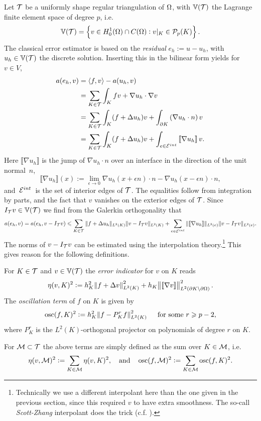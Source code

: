 \documentclass[thesis.tex]{subfiles}
\begin{document}
  Let $\mathcal{T}$ be a uniformly shape regular triangulation of $\Omega$, with $\mathbb{V}(\mathcal{T})$ the Lagrange finite element space of degree $p$, i.e. 
  \[
    \mathbb{V}(\mathcal{T}) = \set{ v \in H_0^1(\Omega) \cap C(\Omega) :  v|_K \in \mathcal{P}_p(K)}.
  \] 
  The classical error estimator is based on the \emph{residual} $e_h := u - u_h$, with $u_h\in \mathbb{V}(\mathcal{T})$ the discrete solution. Inserting this in the bilinear form yields for $v \in V$,
  \begin{align*}
    a(e_h, v) &= \left \langle f,v \right \rangle - a(u_h, v) \\
              &= \sum_{K \in \mathcal{T}} \int_K fv + \nabla u_h \cdot \nabla v \\
              &= \sum_{K \in \mathcal{T}} \int_K (f + \Delta u_h)v+\int_{\partial K} \left(\nabla u_h \cdot n\right) v\\
    &= \sum_{K \in \mathcal{T}} \int_K (f + \Delta u_h)v+\int_{e \in \mathcal{E}^{int}} \left \llbracket \nabla u_h \right \rrbracket  v.
  \end{align*}
  Here $\llbracket \nabla u_h \rrbracket$ is the jump of $\nabla u_h \cdot n$ over an interface in the direction of the unit normal~$n$,
  \[
    \llbracket \nabla u_h \rrbracket(x) := \lim_{\epsilon \to 0} \nabla u_h(x + \epsilon n) \cdot n - \nabla u_h(x - \epsilon n)\cdot n,
  \]
  and~$\mathcal{E}^{int}$~is the set of interior
  edges of $\mathcal{T}$. The equalities follow from integration by parts, and the fact that $v$ vanishes on the exterior edges of $\mathcal{T}$.
  Since $I_{\mathcal{T}} v \in \mathbb{V}(\mathcal{T})$ we find from the Galerkin orthogonality that
  \[
    a(e_h, v) = a(e_h, v - I_{\mathcal{T}} v) \leqslant \sum_{K \in \mathcal{T}} \| f + \Delta u_h\|_{L^2(K)} \| v - I_{\mathcal{T}} v\|_{L^2(K)} + \sum_{e \in \mathcal{E}^{int}} \|\llbracket \nabla u_h \rrbracket \|_{L^2(e)} \|v - I_{\mathcal{T}} v\|_{L^2(e)}.
  \]
  The norms of  $v - I_{\mathcal{T}} v$ can be estimated using the interpolation theory.\footnote{Technically we use a different interpolant here than the one given in the previous section, since this required $v$ to have extra smoothness. The so-call \emph{Scott-Zhang} interpolant does the trick (c.f. \cite[Ch~4.9]{brenner}).} This gives reason for the following definitions.
  \begin{defn}
    \label{def:clasest}
    For $K \in \mathcal{T}$ and $v \in \mathbb{V}(\mathcal{T})$ the \emph{error indicator} for $v$ on $K$ reads
    \[
      \eta(v, K)^2 := h_K^2 \norm{f + \Delta v}^2_{L^2(K)} + h_K\norm{\llbracket \nabla v \rrbracket}^2_{L^2(\partial K\setminus \partial \Omega)}.
    \]
    The \emph{oscillation term} of $f$ on $K$ is given by
    \[
      \operatorname{osc}(f,K)^2 := h_K^2 \norm{f - P_K^r f}^2_{L^2(K)} \quad \text{ for some } r \geqslant p-2,
    \]
    where $P_K^r$ is the $L^2(K)$-orthogonal projector on polynomials of degree $r$ on $K$.

    For $\mathcal{M} \subset \mathcal{T}$ the above terms are simply defined as the sum over $K \in \mathcal{M}$, i.e.
    \[
      \eta(v, \mathcal{M})^2 := \sum_{K \in \mathcal{M}} \eta(v, K)^2, \quad \text{and} \quad \operatorname{osc}(f, \mathcal{M})^2 := \sum_{K \in \mathcal{M}} \operatorname{osc}(f,K)^2.
    \]
  \end{defn}
\end{document}
